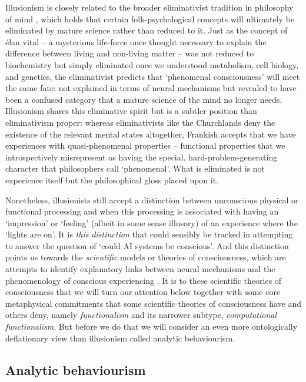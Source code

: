 \documentclass[11pt, a4paper, onecolumn, gdm]{google}
\begin{document}
Illusionism is closely related to the broader eliminativist tradition in philosophy of mind \citep{churchland1981}, which holds that certain folk-psychological concepts will ultimately be eliminated by mature science rather than reduced to it.
Just as the concept of élan vital -- a mysterious life-force once thought necessary to explain the difference between living and non-living matter -- was not reduced to biochemistry but simply eliminated once we understood metabolism, cell biology, and genetics, the eliminativist predicts that `phenomenal consciousness' will meet the same fate: not explained in terms of neural mechanisms but revealed to have been a confused category that a mature science of the mind no longer needs.
Illusionism shares this eliminative spirit but is a subtler position than eliminativism proper: whereas eliminativists like the Churchlands deny the existence of the relevant mental states altogether, Frankish accepts that we have experiences with quasi-phenomenal properties -- functional properties that we introspectively misrepresent as having the special, hard-problem-generating character that philosophers call `phenomenal'.
What is eliminated is not experience itself but the philosophical gloss placed upon it.

Nonetheless, illusionists still accept a distinction between unconscious physical or functional processing and when this processing is associated with having an `impression' or `feeling' (albeit in some sense illusory) of an experience where the `lights are on'.
It is \emph{this distinction} that could sensibly be tracked in attempting to answer the question of `could AI systems be conscious'.
And this distinction points us towards the \emph{scientific} models or theories of consciousness, which are attempts to identify explanatory links between neural mechanisms and the phenomenology of conscious experiencing \citep{seth2022}.
It is to these scientific theories of consciousness that we will turn our attention below together with some core metaphysical commitments that some scientific theories of consciousness have and others deny, namely \emph{functionalism} and its narrower subtype, \emph{computational functionalism}.
But before we do that we will consider an even more ontologically deflationary view than illusionism called analytic behaviourism.

\subsection{Analytic behaviourism}\label{analytic-behaviourism}
\end{document}

